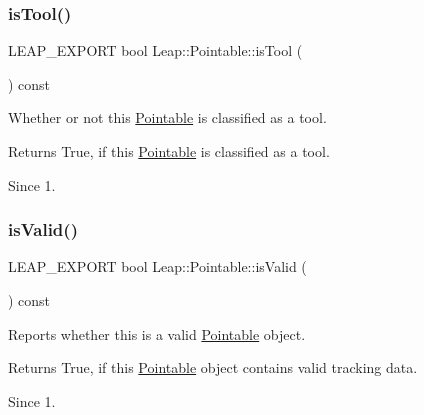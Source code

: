 \subsubsection{\texorpdfstring{is\+Tool()}{isTool()}}
{\footnotesize\ttfamily L\+E\+A\+P\+\_\+\+E\+X\+P\+O\+RT bool Leap\+::\+Pointable\+::is\+Tool (\begin{DoxyParamCaption}{ }\end{DoxyParamCaption}) const}

Whether or not this \hyperlink{class_leap_1_1_pointable}{Pointable} is classified as a tool.


\begin{DoxyCodeInclude}
\end{DoxyCodeInclude}


\begin{DoxyReturn}{Returns}
True, if this \hyperlink{class_leap_1_1_pointable}{Pointable} is classified as a tool. 
\end{DoxyReturn}
\begin{DoxySince}{Since}
1. 
\end{DoxySince}
\mbox{\label{class_leap_1_1_pointable_afe50d02eb1b4f554a4089c329fda1a45}} 
\subsubsection{\texorpdfstring{is\+Valid()}{isValid()}}
{\footnotesize\ttfamily L\+E\+A\+P\+\_\+\+E\+X\+P\+O\+RT bool Leap\+::\+Pointable\+::is\+Valid (\begin{DoxyParamCaption}{ }\end{DoxyParamCaption}) const}

Reports whether this is a valid \hyperlink{class_leap_1_1_pointable}{Pointable} object.


\begin{DoxyCodeInclude}
\end{DoxyCodeInclude}


\begin{DoxyReturn}{Returns}
True, if this \hyperlink{class_leap_1_1_pointable}{Pointable} object contains valid tracking data. 
\end{DoxyReturn}
\begin{DoxySince}{Since}
1. 
\end{DoxySince}
\mbox{\label{class_leap_1_1_pointable_a07add87cda32c2ba106ab271416d26aa}} 
